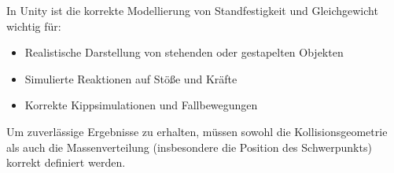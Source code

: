 \begin{remark}
    In Unity ist die korrekte Modellierung von Standfestigkeit und Gleichgewicht wichtig für:
    \begin{itemize}
        \item Realistische Darstellung von stehenden oder gestapelten Objekten
        \item Simulierte Reaktionen auf Stöße und Kräfte
        \item Korrekte Kippsimulationen und Fallbewegungen
    \end{itemize}
    
    Um zuverlässige Ergebnisse zu erhalten, müssen sowohl die Kollisionsgeometrie als auch die Massenverteilung (insbesondere die Position des Schwerpunkts) korrekt definiert werden.
\end{remark}